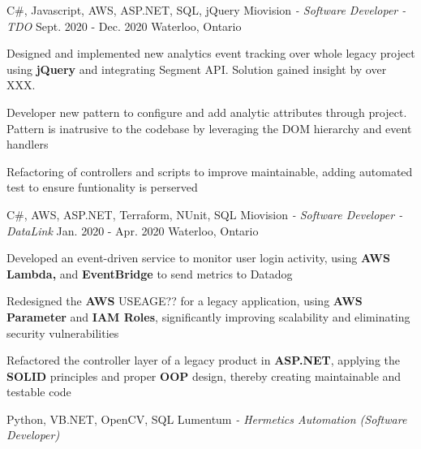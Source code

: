 \begin{siderules}
  \begin{cventries}
    \cventry
    {C\#, Javascript, AWS, ASP.NET, SQL, jQuery}
    {Miovision\hspace{0.15em} \bodyfontlight\itshape{- Software Developer - TDO}}
    {Sept. 2020 - Dec. 2020}
    {Waterloo, Ontario}
    {
      \begin{cvitems}
        \item {Designed and implemented new analytics event tracking over whole legacy project using \textbf{jQuery} and integrating Segment API. Solution gained insight by over XXX.}
        \item {Developer new pattern to configure and add analytic attributes through project. Pattern is inatrusive to the codebase by leveraging the DOM hierarchy and event handlers}
        \item {Refactoring of controllers and scripts to improve maintainable, adding automated test to ensure funtionality is perserved}
      \end{cvitems}
    }
    \cventry
    {C\#, AWS, ASP.NET, Terraform, NUnit, SQL}
    {Miovision\hspace{0.15em} \bodyfontlight\itshape{- Software Developer - DataLink}}
    {Jan. 2020 - Apr. 2020}
    {Waterloo, Ontario}
    {
      \begin{cvitems}
        \item {Developed an event-driven service to monitor user login activity, using \textbf{AWS Lambda,} and \textbf{EventBridge} to send metrics to Datadog}
        \item {Redesigned the \textbf{AWS} USEAGE?? for a legacy application, using \textbf{AWS Parameter} and \textbf{IAM Roles}, significantly improving scalability and eliminating security vulnerabilities}
        \item {Refactored the controller layer of a legacy product in \textbf{ASP.NET}, applying the \textbf{SOLID} principles and proper \textbf{OOP} design, thereby creating maintainable and testable code}
      \end{cvitems}
    }
    \cventry
      {Python, VB.NET, OpenCV, SQL}
      {Lumentum\hspace{0.15em} \bodyfontlight\itshape{- Hermetics Automation (Software Developer)}}

\end{cventries}
\end{siderules}
